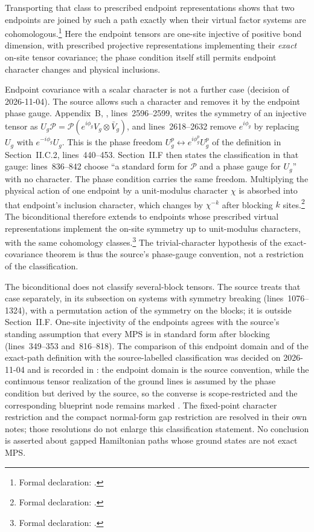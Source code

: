 \documentclass{article}
\begin{document}
Transporting that class to prescribed endpoint representations shows that two
endpoints are joined by such a path exactly when their virtual factor systems
are cohomologous.\footnote{Formal declaration:
    .}
Here the endpoint tensors are one-site injective of positive bond dimension,
with prescribed projective representations implementing their \emph{exact}
on-site tensor covariance; the phase condition itself still permits endpoint
character changes and physical inclusions.

Endpoint covariance with a scalar character is not a further case
(decision of 2026-11-04). The source allows such a character and removes it
by the endpoint phase gauge. Appendix~B,
, lines~2596--2599, writes the symmetry
of an injective tensor as $U_g\mathcal P=\mathcal P(e^{i\phi_g}V_g\otimes\bar
V_g)$, and lines~2618--2632 remove $e^{i\phi_g}$ by replacing $U_g$ with
$e^{-i\phi_g}U_g$. This is the phase freedom $U_g^p\leftrightarrow
e^{i\phi_g^p}U_g^p$ of the definition in Section~II.C.2, lines~440--453.
Section~II.F then states the classification in that gauge: lines~836--842
choose ``a standard form for $\mathcal P$ and a phase gauge for $U_g$'' with
no character. The phase condition carries the same freedom. Multiplying the
physical action of one endpoint by a unit-modulus character $\chi$ is absorbed
into that endpoint's inclusion character, which changes by $\chi^{-k}$ after
blocking $k$ sites.\footnote{Formal declaration:
    .}
The biconditional therefore extends to endpoints whose prescribed virtual
representations implement the on-site symmetry up to unit-modulus characters,
with the same cohomology classes.\footnote{Formal declaration:
    .}
The trivial-character hypothesis of the exact-covariance theorem is thus the
source's phase-gauge convention, not a restriction of the classification.

The biconditional does not classify several-block tensors. The source treats
that case separately, in its subsection on systems with symmetry breaking
(lines~1076--1324), with a permutation action of the symmetry on the blocks;
it is outside Section~II.F. One-site injectivity of the endpoints agrees with
the source's standing assumption that every MPS is in standard form after
blocking (lines~349--353 and~816--818). The comparison of this endpoint
domain and of the exact-path definition with the source-labelled
classification was decided on 2026-11-04 and is recorded in
: the endpoint
domain is the source convention, while the continuous tensor realization
of the ground lines is assumed by the phase condition but derived by the
source, so the converse is scope-restricted and the corresponding blueprint
node remains marked . The fixed-point
character restriction and the compact normal-form gap restriction are resolved
in their own notes; those resolutions do not enlarge this classification
statement. No conclusion is asserted about gapped Hamiltonian paths whose
ground states are not exact MPS.
\end{document}
